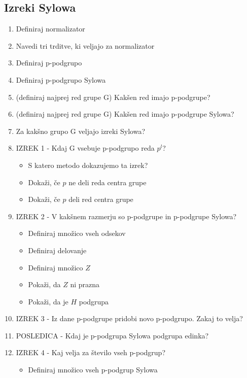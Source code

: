 \documentclass{article}
\begin{document}
    \subsection{Izreki Sylowa}
    \begin{enumerate}
        \item Definiraj normalizator
        \item Navedi tri trditve, ki veljajo za normalizator
        \item Definiraj p-podgrupo
        \item Definiraj p-podgrupo Sylowa
        \item (definiraj najprej red grupe G) Kakšen red imajo p-podgrupe?
        \item (definiraj najprej red grupe G) Kakšen red imajo p-podgrupe Sylowa?
        \item Za kakšno grupo G veljajo izreki Sylowa?
        \item IZREK 1 - Kdaj G vsebuje p-podgrupo reda $p^l$?
        \begin{itemize}
            \item S katero metodo dokazujemo ta izrek?
            \item Dokaži, če $p$ ne deli reda centra grupe
            \item Dokaži, če $p$ deli red centra grupe
        \end{itemize}
        \item IZREK 2 - V kakšnem razmerju so p-podgrupe in p-podgrupe Sylowa?
         \begin{itemize}
             \item Definiraj množico vseh odsekov
             \item Definiraj delovanje
             \item Definiraj množico $Z$
             \item Pokaži, da $Z$ ni prazna
             \item Pokaži, da je $H$ podgrupa
         \end{itemize}
         \item IZREK 3 - Iz dane p-podgrupe pridobi novo p-podgrupo. Zakaj to velja?
         \item POSLEDICA - Kdaj je p-podgrupa Sylowa podgrupa edinka?
         \item IZREK 4 - Kaj velja za število vseh p-podgrup?
         \begin{itemize}
             \item Definiraj množico vseh p-podgrup Sylowa

\end{itemize}
\end{enumerate}
\end{document}
